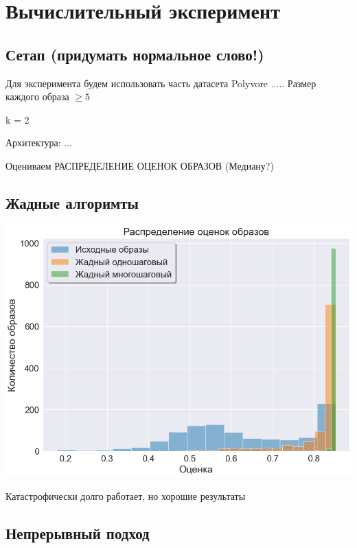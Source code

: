 \documentclass[a4paper,12pt]{article}
\begin{document}
		
		\section{Вычислительный эксперимент}
			\subsection{Сетап (придумать нормальное слово!)}
					Для эксперимента будем использовать часть датасета Polyvore \cite{DBLP:journals/corr/HanWJD17}..... 
					Размер каждого образа $\geqslant 5$
					
					k = 2
					
					
					Архитектура: ...
					
					Оцениваем РАСПРЕДЕЛЕНИЕ ОЦЕНОК ОБРАЗОВ (Медиану?)
					
			\subsection{Жадные алгоримты}
			
				
				\includegraphics[scale = 0.7]{../figures/greedy_at_least_5_subset1000.png}
				
				Катастрофически долго работает, но хорошие результаты
				
			\subsection{Непрерывный подход}
			
\end{document}
